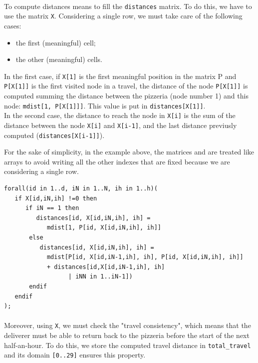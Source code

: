 \documentclass[10pt]{article}
\begin{document}
	\paragraph*{}
	To compute distances means to fill the \texttt{distances} matrix.
    To do this, we have to use the matrix \texttt{X}. 
	Considering a single row, we must take care of the following cases:
	\begin{itemize}
		\item the first (meaningful) cell;
		\item the other (meaningful) cells.
	\end{itemize}
	
	
	In the first case, if \texttt{X[1]} is the first meaningful position in the 
	matrix P and \texttt{P[X[1]]} is the first visited node in a travel,
	the distance of the node \texttt{P[X[1]]} is computed summing the 
	distance between the pizzeria (node number 1) and this node: \texttt{mdist[1, P[X[1]]]}.
	This value is put in \texttt{distances[X[1]]}.\\
	
	In the second case, the distance to reach the node in \texttt{X[i]} is 
	the sum of the distance between the node \texttt{X[i]} and \texttt{X[i-1]}, and the last 
	distance previusly computed (\texttt{distances[X[i-1]]}). 
	
	For the sake of simplicity, in the example above, the matrices  and  are treated 
	like arrays to avoid writing all the other indexes that are fixed because we are considering a single 
	row.

	
	\begin{verbatim}
forall(id in 1..d, iN in 1..N, ih in 1..h)(
   if X[id,iN,ih] !=0 then
      if iN == 1 then
         distances[id, X[id,iN,ih], ih] = 
            mdist[1, P[id, X[id,iN,ih], ih]] 
       else
          distances[id, X[id,iN,ih], ih] = 
            mdist[P[id, X[id,iN-1,ih], ih], P[id, X[id,iN,ih], ih]] 
         	+ distances[id,X[id,iN-1,ih], ih]
                  | iNN in 1..iN-1])
       endif
   endif
);
	\end{verbatim}

	\paragraph*{}
	Moreover, using \texttt{X}, we must check the "travel consistency", which 
	means that the deliverer must be able to return back to the pizzeria before the 
	start of the next half-an-hour. 
	To do this, we store the computed travel distance in \texttt{total\_travel} and its 
	domain \texttt{[0..29]} ensures this property.  
\end{document}

